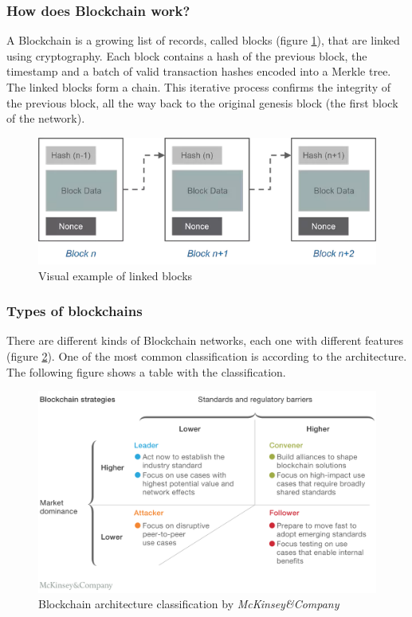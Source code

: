 \subsubsection{How does Blockchain work?}
A Blockchain is a growing list of records, called blocks (figure \ref{fig:linked_blocks}), that are linked using cryptography. Each block contains a hash of the previous block, the timestamp and a batch of valid transaction hashes encoded into a Merkle tree. The linked blocks form a chain. This iterative process confirms the integrity of the previous block, all the way back to the original genesis block (the first block of the network).
\begin{figure}[h]
    \centering
    \includegraphics[width=1.0\textwidth]{images/State of the Art/blockchain/block-example.png}
    \caption{Visual example of linked blocks}
    \label{fig:linked_blocks}
\end{figure}

\subsubsection{Types of blockchains}
There are different kinds of Blockchain networks, each one with different features (figure  \ref{fig:blockchain_classification}). One of the most common classification is according to the architecture. The following figure shows a table with the classification.
\begin{figure}[h]
    \centering
    \includegraphics[width=1.0\textwidth]{images/State of the Art/blockchain/Blockchain-types.png}
    \caption{Blockchain architecture classification by \textit{McKinsey\&Company}}
    \label{fig:blockchain_classification}
\end{figure}


